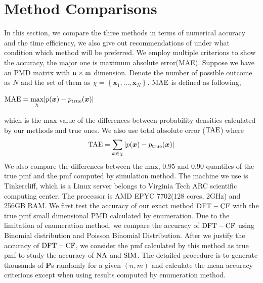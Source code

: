 \documentclass[12pt]{article}
\newcommand{\Pmat}{\mathbf{P}}
\newcommand{\TAE}{{\rm TAE}}
\newcommand{\MAE}{{\rm MAE}}
\newcommand{\PMD}{\textrm{PMD}}
\newcommand{\xvec}{\boldsymbol{x}}
\newcommand{\SIM}{{\rm SIM}}
\newcommand{\NA}{{\rm NA}}
\newcommand{\dft}{{\rm DFT-CF}}
\begin{document}
\section{Method Comparisons}\label{sec:Method Comparisons}
In this section, we compare the three methods in terms of numerical accuracy and the time efficiency, we also give out recommendations of under what condition which method will be preferred. We employ multiple criterions to show the accuracy, the major one is maximum absolute error(MAE). Suppose we have an PMD matrix with $\rm n\times m$ dimension. Denote the number of possible outcome as $N$ and the set of them as $\chi = \left\{\xvec_1,\dots, \xvec_{N}\right\}$. $\MAE$ is defined as following,
\begin{center}
$\mathrm{\MAE} = \underset{\chi}{\max}|p(\xvec) - p_{\text{true}}(\xvec)|$
\end{center}
which is the max value of the differences between probability densities calculated by our methods and true ones.
We also use total absolute error ($\TAE$)  where
\begin{equation*}
    \mbox{\TAE} = \sum_{\xvec \in \chi} |p(\xvec) - p_{\text{true}}(\xvec)|
\end{equation*}
We also compare the differences between the max, $0.95$ and $0.90$ quantiles of the true pmf and the pmf computed by simulation method. The machine we use is Tinkercliff, which is a Linux server belongs to Virginia Tech ARC scientific computing center. The processor is AMD EPYC 7702(128 cores, 2GHz) and 256GB RAM. We first test the accuracy of our exact method $\dft$ with the true pmf small dimensional $\PMD$ calculated by enumeration. Due to the limitation of enumeration method, we compare the accuracy of $\dft$ using Binomial distribution and Poisson Binomial Distribution. %
After we justify the accuracy of $\dft$, we consider the pmf calculated by this method as true pmf to study the accuracy of $\NA$ and $\SIM$. The detailed procedure is to generate thousands of $\Pmat$s randomly for a given $(n,m)$ and calculate the mean accuracy criterions except when using results computed by enumeration method.

 




\end{document}
